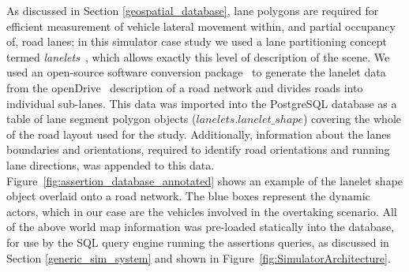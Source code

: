 
As discussed in Section \ref{geospatial_database}, lane polygons are required for efficient measurement of vehicle lateral movement within, and partial occupancy of, road lanes; in this simulator case study we used a lane partitioning concept termed \textit{lanelets}~\cite{lanelets2014}, which allows exactly this level of description of the scene. We used an open-source software conversion package~\cite{lanelets_to_openDrive} to generate the lanelet data from the openDrive~\cite{opendrive} description of a road network and divides roads into individual sub-lanes. This data was imported into the PostgreSQL database as a table of lane segment polygon objects ($lanelets.lanelet\_shape$) covering the whole of the road layout used for the study. Additionally, information about the lanes boundaries and orientations, required to identify road orientations and running lane directions, was appended to this data. 
%
Figure~\ref{fig:assertion_database_annotated} shows an example of the lanelet shape object overlaid onto a road network. The blue boxes represent the dynamic actors, which in our case are the vehicles involved in the overtaking scenario. 
%
All of the above world map information was pre-loaded statically into the database, for use by the SQL query engine running the assertions queries, as discussed in Section \ref{generic_sim_system} and shown in Figure~\ref{fig:SimulatorArchitecture}.

